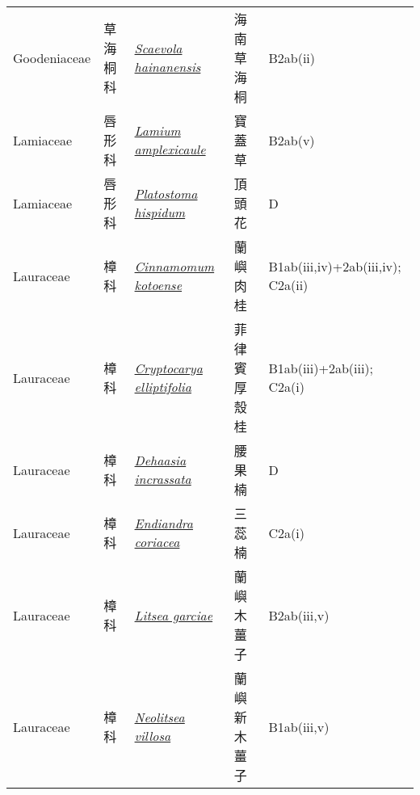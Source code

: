 {\begin{longtable}{L{2.5cm}L{2cm}L{5cm}L{2.5cm}L{3cm}}
    Goodeniaceae & 草海桐科 & \href{http://www.theplantlist.org/tpl1.1/search?q=Scaevola+hainanensis}{\textit{Scaevola hainanensis} } & 海南草海桐 & B2ab(ii)    \\
    Lamiaceae & 唇形科 & \href{http://www.theplantlist.org/tpl1.1/search?q=Lamium+amplexicaule}{\textit{Lamium amplexicaule} } & 寶蓋草 & B2ab(v)    \\
    Lamiaceae & 唇形科 & \href{http://www.theplantlist.org/tpl1.1/search?q=Platostoma+hispidum}{\textit{Platostoma hispidum} } & 頂頭花 & D    \\
    Lauraceae & 樟科 & \href{http://www.theplantlist.org/tpl1.1/search?q=Cinnamomum+kotoense}{\textit{Cinnamomum kotoense} } & 蘭嶼肉桂 & B1ab(iii,iv)+2ab(iii,iv); C2a(ii)    \\
    Lauraceae & 樟科 & \href{http://www.theplantlist.org/tpl1.1/search?q=Cryptocarya+elliptifolia}{\textit{Cryptocarya elliptifolia} } & 菲律賓厚殼桂 & B1ab(iii)+2ab(iii); C2a(i)    \\
    Lauraceae & 樟科 & \href{http://www.theplantlist.org/tpl1.1/search?q=Dehaasia+incrassata}{\textit{Dehaasia incrassata} } & 腰果楠 & D    \\
    Lauraceae & 樟科 & \href{http://www.theplantlist.org/tpl1.1/search?q=Endiandra+coriacea}{\textit{Endiandra coriacea} } & 三蕊楠 & C2a(i)    \\
    Lauraceae & 樟科 & \href{http://www.theplantlist.org/tpl1.1/search?q=Litsea+garciae}{\textit{Litsea garciae} } & 蘭嶼木薑子 & B2ab(iii,v)    \\
    Lauraceae & 樟科 & \href{http://www.theplantlist.org/tpl1.1/search?q=Neolitsea+villosa}{\textit{Neolitsea villosa} } & 蘭嶼新木薑子 & B1ab(iii,v)    \\

\end{longtable}}
